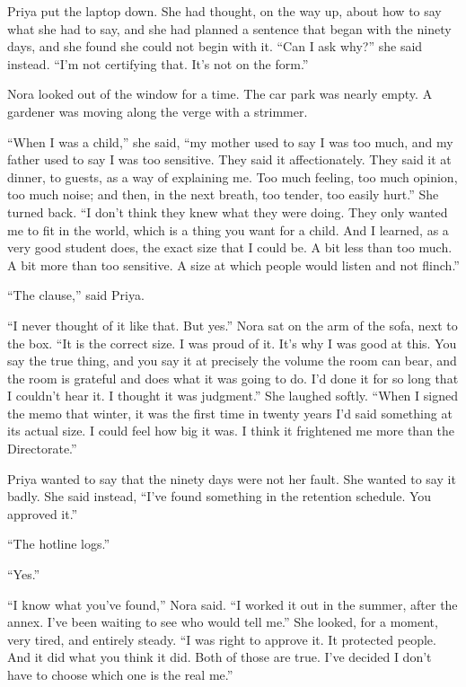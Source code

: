 Priya put the laptop down. She had thought, on the way up, about how to say what she had to say, and she had planned a sentence that began with the ninety days, and she found she could not begin with it. ``Can I ask why?'' she said instead. ``I'm not certifying that. It's not on the form.''

Nora looked out of the window for a time. The car park was nearly empty. A gardener was moving along the verge with a strimmer.

``When I was a child,'' she said, ``my mother used to say I was too much, and my father used to say I was too sensitive. They said it affectionately. They said it at dinner, to guests, as a way of explaining me. Too much feeling, too much opinion, too much noise; and then, in the next breath, too tender, too easily hurt.'' She turned back. ``I don't think they knew what they were doing. They only wanted me to fit in the world, which is a thing you want for a child. And I learned, as a very good student does, the exact size that I could be. A bit less than too much. A bit more than too sensitive. A size at which people would listen and not flinch.''

``The clause,'' said Priya.

``I never thought of it like that. But yes.'' Nora sat on the arm of the sofa, next to the box. ``It is the correct size. I was proud of it. It's why I was good at this. You say the true thing, and you say it at precisely the volume the room can bear, and the room is grateful and does what it was going to do. I'd done it for so long that I couldn't hear it. I thought it was judgment.'' She laughed softly. ``When I signed the memo that winter, it was the first time in twenty years I'd said something at its actual size. I could feel how big it was. I think it frightened me more than the Directorate.''

Priya wanted to say that the ninety days were not her fault. She wanted to say it badly. She said instead, ``I've found something in the retention schedule. You approved it.''

``The hotline logs.''

``Yes.''

``I know what you've found,'' Nora said. ``I worked it out in the summer, after the annex. I've been waiting to see who would tell me.'' She looked, for a moment, very tired, and entirely steady. ``I was right to approve it. It protected people. And it did what you think it did. Both of those are true. I've decided I don't have to choose which one is the real me.''

